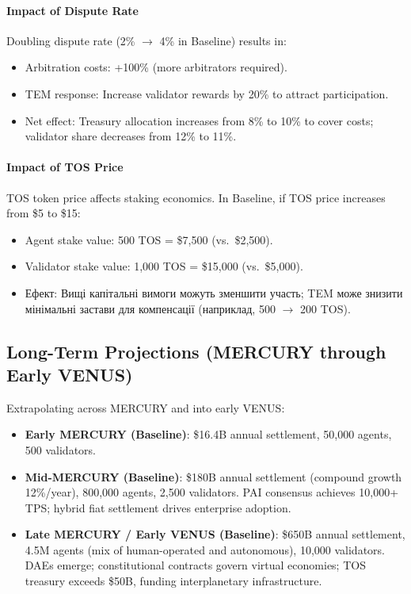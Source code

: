 \documentclass[11pt]{article}
\begin{document}
\paragraph{Impact of Dispute Rate}
Doubling dispute rate (2\% $\to$ 4\% in Baseline) results in:
\begin{itemize}[noitemsep]
  \item Arbitration costs: +100\% (more arbitrators required).
  \item TEM response: Increase validator rewards by 20\% to attract participation.
  \item Net effect: Treasury allocation increases from 8\% to 10\% to cover costs; validator share decreases from 12\% to 11\%.
\end{itemize}

\paragraph{Impact of TOS Price}
TOS token price affects staking economics. In Baseline, if TOS price increases from \$5 to \$15:
\begin{itemize}[noitemsep]
  \item Agent stake value: 500 TOS = \$7{,}500 (vs.\ \$2{,}500).
  \item Validator stake value: 1,000 TOS = \$15{,}000 (vs.\ \$5{,}000).
  \item Ефект: Вищі капітальні вимоги можуть зменшити участь; TEM може знизити мінімальні застави для компенсації (наприклад, 500 $\to$ 200 TOS).
\end{itemize}

\subsection{Long-Term Projections (MERCURY through Early VENUS)}
Extrapolating across MERCURY and into early VENUS:
\begin{itemize}[noitemsep]
  \item \textbf{Early MERCURY (Baseline)}: \$16.4B annual settlement, 50,000 agents, 500 validators.
  \item \textbf{Mid-MERCURY (Baseline)}: \$180B annual settlement (compound growth 12\%/year), 800,000 agents, 2,500 validators. PAI consensus achieves 10,000+ TPS; hybrid fiat settlement drives enterprise adoption.
  \item \textbf{Late MERCURY / Early VENUS (Baseline)}: \$650B annual settlement, 4.5M agents (mix of human-operated and autonomous), 10,000 validators. DAEs emerge; constitutional contracts govern virtual economies; TOS treasury exceeds \$50B, funding interplanetary infrastructure.
\end{itemize}
\end{document}
